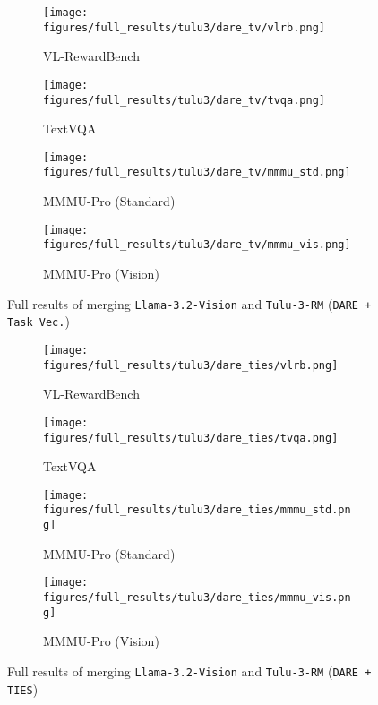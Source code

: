 \begin{figure*}[ht]
     \centering
     \begin{subfigure}[b]{0.245\linewidth}
         \centering
         \texttt{[image: figures/full\_results/tulu3/dare\_tv/vlrb.png]}
         \caption{VL-RewardBench}
     \end{subfigure}
     \hfill
     \begin{subfigure}[b]{0.245\linewidth}
         \centering
         \texttt{[image: figures/full\_results/tulu3/dare\_tv/tvqa.png]}
         \caption{TextVQA}
     \end{subfigure}
     \hfill
      \begin{subfigure}[b]{0.245\linewidth}
         \centering
         \texttt{[image: figures/full\_results/tulu3/dare\_tv/mmmu\_std.png]}
         \caption{MMMU-Pro (Standard)}
     \end{subfigure}
     \hfill
     \begin{subfigure}[b]{0.245\linewidth}
         \centering
         \texttt{[image: figures/full\_results/tulu3/dare\_tv/mmmu\_vis.png]}
         \caption{MMMU-Pro (Vision)}
     \end{subfigure}
        \caption{Full results of merging \texttt{Llama-3.2-Vision} and \texttt{Tulu-3-RM} (\texttt{DARE + Task Vec.})}
        \vspace{-10pt}
        \label{fig:full_tulu3_dare_tv}
\end{figure*}

\begin{figure*}[ht]
     \centering
     \begin{subfigure}[b]{0.245\linewidth}
         \centering
         \texttt{[image: figures/full\_results/tulu3/dare\_ties/vlrb.png]}
         \caption{VL-RewardBench}
     \end{subfigure}
     \hfill
     \begin{subfigure}[b]{0.245\linewidth}
         \centering
         \texttt{[image: figures/full\_results/tulu3/dare\_ties/tvqa.png]}
         \caption{TextVQA}
     \end{subfigure}
     \hfill
      \begin{subfigure}[b]{0.245\linewidth}
         \centering
         \texttt{[image: figures/full\_results/tulu3/dare\_ties/mmmu\_std.png]}
         \caption{MMMU-Pro (Standard)}
     \end{subfigure}
     \hfill
     \begin{subfigure}[b]{0.245\linewidth}
         \centering
         \texttt{[image: figures/full\_results/tulu3/dare\_ties/mmmu\_vis.png]}
         \caption{MMMU-Pro (Vision)}
     \end{subfigure}
        \caption{Full results of merging \texttt{Llama-3.2-Vision} and \texttt{Tulu-3-RM} (\texttt{DARE + TIES})}
        \vspace{-10pt}
        \label{fig:full_tulu3_dare_ties}
\end{figure*}